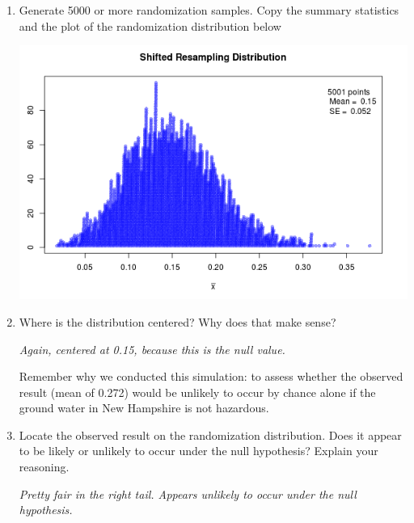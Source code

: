 \begin{enumerate}
\begin{key}
  {\it The (resample) mean arsenic concentration in toe nails of 19
    New Hampshire residents who use a private well if the true arsenic
    concentration is 0.15 (right at the edge of being  hazardous) }
\end{key}
\item Generate 5000 or more randomization samples.  Copy the summary statistics and
the plot of the randomization distribution below
\begin{students}
  \vspace{4cm}
\end{students}

\begin{key}
  {\it \includegraphics[width=.5\linewidth]{../plots/arsenicNullDistn.png}}
\end{key}


\item 
 Where is the distribution centered?  Why does that make sense?
\begin{students}
  \vspace{1cm}
\end{students}
\begin{key}
  {\it Again, centered at 0.15, because this is the null value. }
\end{key}

Remember why we conducted this simulation: to assess whether the
observed result (mean of 0.272) would be unlikely to occur by chance
alone if the ground water in New Hampshire is not hazardous. 

\item Locate the observed result on the randomization distribution.
  Does it appear to be likely or unlikely to occur under the null
  hypothesis?  Explain your reasoning.
\begin{students}
  \vspace{1cm}
\end{students}

\begin{key}
  {\it Pretty fair in the right tail.  Appears unlikely to occur under
    the null hypothesis. } 
\end{key}


\end{enumerate}

